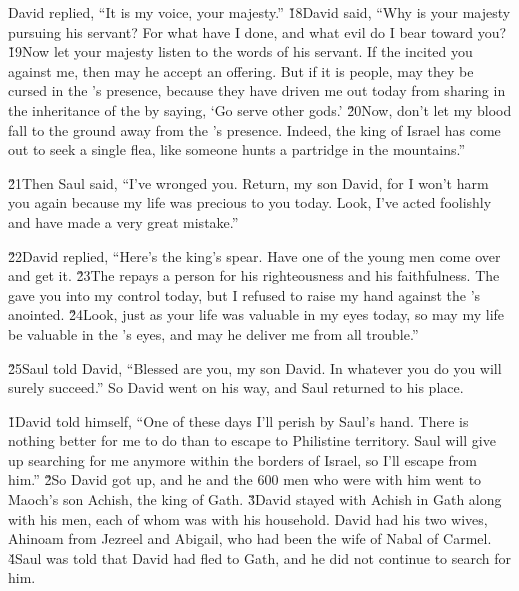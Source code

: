 David replied, ``It is my voice, your majesty.'' \v{18}David said, ``Why is your majesty pursuing his servant? For what have I done, and what evil do I bear toward you? \v{19}Now let your majesty listen to the words of his servant. If the  incited you against me, then may he accept an offering. But if it is people, may they be cursed in the 's presence, because they have driven me out today from sharing in the inheritance of the  by saying, `Go serve other gods.' \v{20}Now, don't let my blood fall to the ground away from the 's presence. Indeed, the king of Israel has come out to seek a single flea, like someone hunts a partridge in the mountains.''

\v{21}Then Saul said, ``I've wronged you. Return, my son David, for I won't harm you again because my life was precious to you today. Look, I've acted foolishly and have made a very great mistake.''

\v{22}David replied, ``Here's the king's spear. Have one of the young men come over and get it. \v{23}The  repays a person for his righteousness and his faithfulness. The  gave you into my control today, but I refused to raise my hand against the 's anointed. \v{24}Look, just as your life was valuable in my eyes today, so may my life be valuable in the 's eyes, and may he deliver me from all trouble.''

\v{25}Saul told David, ``Blessed are you, my son David. In whatever you do you will surely succeed.'' So David went on his way, and Saul returned to his place.

\v{1}David told himself, ``One of these days I'll perish by Saul's hand. There is nothing better for me to do than to escape to Philistine territory. Saul will give up searching for me anymore within the borders of Israel, so I'll escape from him.'' \v{2}So David got up, and he and the 600 men who were with him went to Maoch's son Achish, the king of Gath. \v{3}David stayed with Achish in Gath along with his men, each of whom was with his household. David had his two wives, Ahinoam from Jezreel and Abigail, who had been the wife of Nabal of Carmel. \v{4}Saul was told that David had fled to Gath, and he did not continue to search for him.

